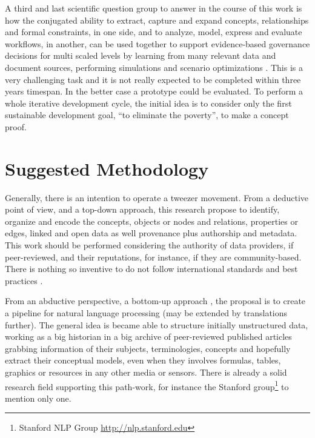 \documentclass[
	12pt, %
	a4paper, %
	oneside, %
	headinclude, footinclude, %
	BCOR5mm, %
]{scrartcl}
\begin{document}
A third and last scientific question group to answer in the course of this work is how the conjugated ability to extract, capture and expand concepts, relationships and formal constraints, in one side, and to analyze, model, express and evaluate workflows, in another, can be used together to support evidence-based governance decisions for multi scaled levels by learning from many relevant data and document sources, performing simulations and scenario optimizations \citep{pitt_axiomatization_2012}. This is a very challenging task and it is not really expected to be completed within three years timespan. In the better case a prototype could be evaluated. To perform a whole iterative development cycle, the initial idea is to consider only the first \citet{united_nations_transforming_2015} sustainable development goal, ``to eliminate the poverty'', to make a concept proof.

\section{Suggested Methodology}

Generally, there is an intention to operate a tweezer movement. From a deductive point of view, and a top-down approach, this research propose to identify, organize and encode the concepts, objects or nodes and relations, properties or edges, linked and open data \citep{berners-lee_publishing_2001,berners-lee_linked_2006,bizer_linked_2009} as well provenance \citep{lebo_prov-o:_2013} plus authorship and metadata. This work should be performed considering the authority of data providers, if peer-reviewed, and their reputations, for instance, if they are community-based. There is nothing so inventive to do not follow international standards \citep{w3c_w3c_2015} and best practices \citep{tandy_spatial_2016}.

From an abductive perspective, a bottom-up approach \citep{gil_data_2009}, the proposal is to create a pipeline for natural language processing \citep{blei_probabilistic_2012} (may be extended by translations further). The general idea is became able to structure initially unstructured data, working as a big historian in a big archive of peer-reviewed published articles grabbing information of their subjects, terminologies, concepts and hopefully extract their conceptual models, even when they involves formulas, tables, graphics or resources in any other media or sensors. There is already a solid research field supporting this path-work, for instance the Stanford group\footnote{Stanford NLP Group \url{http://nlp.stanford.edu}} to mention only one.
\end{document}
